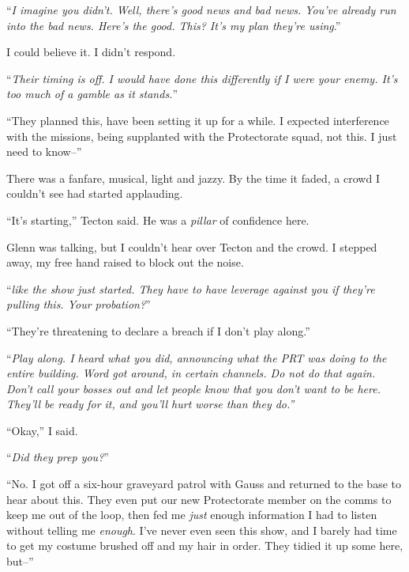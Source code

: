 ``\emph{I imagine you didn't.  Well, there's good news and bad news.  You've already run into the bad news.  Here's the good.  This?  It's my plan they're using}.''



I could believe it.  I didn't respond.



``\emph{Their timing is off.  I would have done this differently if I were your enemy.  It's too much of a gamble as it stands.}''



``They planned this, have been setting it up for a while.  I expected interference with the missions, being supplanted with the Protectorate squad, not this.  I just need to know--''



There was a fanfare, musical, light and jazzy.  By the time it faded, a crowd I couldn't see had started applauding.



``It's starting,'' Tecton said.  He was a \emph{pillar} of confidence here.



Glenn was talking, but I couldn't hear over Tecton and the crowd.  I stepped away, my free hand raised to block out the noise.



``\emph{\ldotsnds like the show just started.  They have to have leverage against you if they're pulling this.  Your probation?}''



``They're threatening to declare a breach if I don't play along.''



``\emph{Play along.  I heard what you did, announcing what the PRT was doing to the entire building.  Word got around, in certain channels.  Do not do that again.  Don't call your bosses out and let people know that you don't want to be here.  They'll be ready for it, and you'll hurt worse than they do.''}



``Okay,'' I said.



``\emph{Did they prep you?}''



``No.   I got off a six-hour graveyard patrol with Gauss and returned to the base to hear about this.  They even put our new Protectorate member on the comms to keep me out of the loop, then fed me \emph{just} enough information I had to listen without telling me \emph{enough}.  I've never even seen this show, and I barely had time to get my costume brushed off and my hair in order.  They tidied it up some here, but--''



